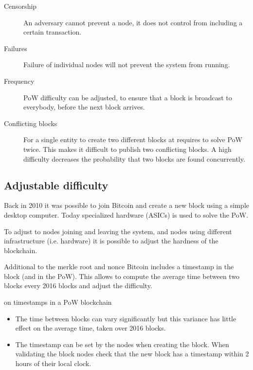 \begin{description}
	\item[Censorship] An adversary cannot prevent a node, it does not control from including a certain transaction.
	\item[Failures] Failure of individual nodes will not prevent the system from running.
	\item[Frequency] PoW difficulty can be adjusted, to ensure that a block is broadcast to everybody, before the next block arrives.
	\item[Conflicting blocks] For a single entity to create two different blocks at requires to solve PoW twice. This makes it difficult to publish two conflicting blocks.
	A high difficulty decreases the probability that two blocks are found concurrently.
\end{description}

\subsection{Adjustable difficulty}
Back in 2010 it was possible to join Bitcoin and create a new block using a simple desktop computer. Today specialized hardware (ASICs) is used to solve the PoW.
\begin{idea} To adjust to nodes joining and leaving the system, and nodes using different infrastructure (i.e. hardware) it is possible to adjust the hardness of the blockchain.
\end{idea}

\begin{definition}
Additional to the merkle root and nonce Bitcoin includes a timestamp in the	block (and in the PoW). This allows to compute the average time between two blocks every 2016 blocks and adjust the difficulty.
\end{definition}

\begin{note} on timestamps in a PoW blockchain
	
\begin{itemize}
	\item The time between blocks can vary significantly but this variance has little effect on the average time, taken over 2016 blocks.
	\item The timestamp can be set by the nodes when creating the block. When validating the block nodes check that the new block has a timestamp within 2 hours of their local clock.
\end{itemize}
\end{note}

